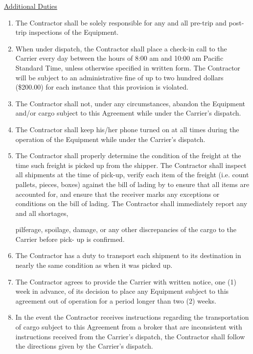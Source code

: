 \underline{Additional Duties}
\begin{enumerate}[ 
    ref = \SecondLevelEnumerator
]
    \item The Contractor shall be solely responsible for any and all
    pre-trip and post-trip inspections of the Equipment.

    \item When under dispatch, the Contractor shall place a check-in call
    to the Carrier every day between the hours of 8:00 am and 10:00 am
    Pacific Standard Time, unless otherwise specified in written form. The
    Contractor will be subject to an administrative fine of up to two
    hundred dollars (\$200.00) for each instance that this provision is
    violated.
    
    \item The Contractor shall not, under any circumstances, abandon the
    Equipment and/or cargo subject to this Agreement while under the
    Carrier's dispatch.
    \item The Contractor shall keep his/her phone turned on at all times
    during the operation of the Equipment while under the Carrier's
    dispatch.
    \item The Contractor shall properly determine the condition of the
    freight at the time such freight is picked up from the shipper. The
    Contractor shall inspect all shipments at the time of pick-up, verify
    each item of the freight (i.e. count pallets, pieces, boxes) against
    the bill of lading by to ensure that all items are accounted for, and
    ensure that the receiver marks any exceptions or conditions on the bill
    of lading. The Contractor shall immediately report any and all
    shortages,

    pilferage, spoilage, damage, or any other discrepancies of the cargo to
    the Carrier before pick- up is confirmed.

    \item The Contractor has a duty to transport each shipment to its
    destination in nearly the same condition as when it was picked up.
    \item The Contractor agrees to provide the Carrier with written notice,
    one (1) week in advance, of its decision to place any Equipment subject
    to this agreement out of operation for a period longer than two (2)
    weeks.
    \item In the event the Contractor receives instructions regarding the
    transportation of cargo subject to this Agreement from a broker that
    are inconsistent with instructions received from the Carrier's
    dispatch, the Contractor shall follow the directions given by the
    Carrier's dispatch.
\end{enumerate}